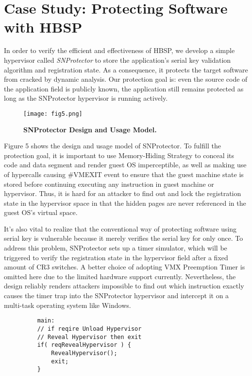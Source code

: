 \documentclass[conference]{IEEEtran}
\begin{document}
{\section{Case Study: Protecting Software with HBSP}
In order to verify the efficient and effectiveness of HBSP, we
develop a simple hypervisor called \emph{SNProtector} to store the
application's serial key validation algorithm and registration
state. As a consequence, it protects the target software from
cracked by dynamic analysis. Our protection goal is: even the
source code of the application field is publicly known, the
application still remains protected as long as the SNProtector
hypervisor is running actively.

\begin{figure}[!htb]
\begin{center}
\texttt{[image: fig5.png]}
\end{center}
\caption{{\bf SNProtector Design and Usage Model.}} \label{Figure
5.}
\end{figure}

Figure 5 shows the design and usage model of SNProtector. To
fulfill the protection goal, it is important to use Memory-Hiding
Strategy to conceal its code and data segment and render guest OS
imperceptible, as well as making use of hypercalls causing
\#VMEXIT event to ensure that the guest machine state is stored
before continuing executing any instruction in guest machine or
hypervisor. Thus, it is hard for an attacker to find out and lock
the registration state in the hypervisor space in that the hidden
pages are never referenced in the guest OS's virtual space.

It's also vital to realize that the conventional way of protecting
software using serial key is vulnerable because it merely verifies
the serial key for only once. To address this problem, SNProtector
sets up a timer simulator, which will be triggered to verify the
registration state in the hypervisor field after a fixed amount of
CR3 switches. A better choice of adopting VMX Preemption Timer is
omitted here due to the limited hardware support currently.
Nevertheless, the design reliably renders attackers impossible to
find out which instruction exactly causes the timer trap into the
SNProtector hypervisor and intercept it on a multi-task operating
system like Windows.


\begin{figure}[!htb]
\centering
\begin{lstlisting}
    main:
    // if reqire Unload Hypervisor
    // Reveal Hypervisor then exit
    if( reqRevealHypervisor ) {
        RevealHypervisor();
        exit;
    }


\end{lstlisting}
\end{figure}}
\end{document}

